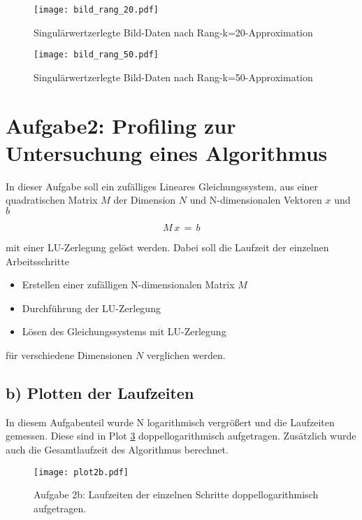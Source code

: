 \begin{figure}[h]
    \centering
    \texttt{[image: bild\_rang\_20.pdf]}
    \caption{Singulärwertzerlegte Bild-Daten nach Rang-k=20-Approximation}
    \label{fig:1b_20}
\end{figure}

\begin{figure}[h]
    \centering
    \texttt{[image: bild\_rang\_50.pdf]}
    \caption{Singulärwertzerlegte Bild-Daten nach Rang-k=50-Approximation}
    \label{fig:1b_50}
\end{figure}

\section*{Aufgabe2: Profiling zur Untersuchung eines Algorithmus}
In dieser Aufgabe soll ein zufälliges Lineares Gleichungssystem, aus einer quadratischen Matrix $M$ der Dimension $N$ und N-dimensionalen Vektoren $x$ und $b$

\begin{equation*}
  M\, x\, =\, b
\end{equation*}

\noindent
mit einer LU-Zerlegung gelöst werden. Dabei soll die Laufzeit der einzelnen Arbeitsschritte

\begin{itemize}
  \item[1)] Erstellen einer zufälligen N-dimensionalen Matrix $M$
  \item[2)] Durchführung der LU-Zerlegung
  \item[3)] Lösen des Gleichungssystems mit LU-Zerlegung
\end{itemize}

\noindent
für verschiedene Dimensionen $N$ verglichen werden.

\subsection*{b) Plotten der Laufzeiten}
In diesem Aufgabenteil wurde N logarithmisch vergrößert und die Laufzeiten gemessen. Diese sind in Plot \ref{fig:plot2b} doppellogarithmisch aufgetragen. Zusätzlich wurde auch die Gesamtlaufzeit des Algorithmus berechnet.

\FloatBarrier
\begin{figure}[h]
    \centering
    \texttt{[image: plot2b.pdf]}
    \caption{Aufgabe 2b: Laufzeiten der einzelnen Schritte doppellogarithmisch aufgetragen.}
    \label{fig:plot2b}
\end{figure}
\FloatBarrier

